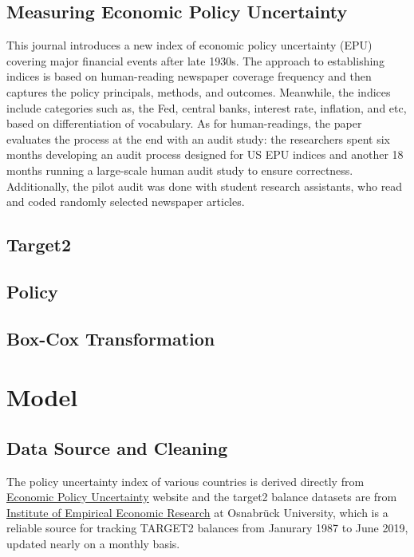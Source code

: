 \documentclass[12pt]{article}
\begin{document}
\subsection{Measuring Economic Policy Uncertainty}
This journal introduces a new index of economic policy uncertainty (EPU) covering major financial events after late 1930s. The approach to establishing indices is based on human-reading newspaper coverage frequency and then captures the policy principals, methods, and outcomes. Meanwhile, the indices include categories such as, the Fed, central banks, interest rate, inflation, and etc, based on differentiation of vocabulary. As for human-readings, the paper evaluates the process at the end with an audit study: the researchers spent six months developing an audit process designed for US EPU indices and another 18 months running a large-scale human audit study to ensure correctness. Additionally, the pilot audit was done with student research assistants, who read and coded randomly selected newspaper articles. 
\subsection{Target2}
\subsection{Policy}
\subsection{Box-Cox Transformation}

\section{Model} \label{sec:model}
\subsection{Data Source and Cleaning}

The policy uncertainty index of various countries is derived directly from \href{https://www.policyuncertainty.com/monetary.html}{\underline{Economic Policy Uncertainty}} website and the target2 balance datasets are from \href{http://www.eurocrisismonitor.com}{\underline{Institute of Empirical Economic Research}} at Osnabrück University, which is a reliable source for tracking TARGET2 balances from Janurary 1987 to June 2019, updated nearly on a monthly basis. 
\end{document}
